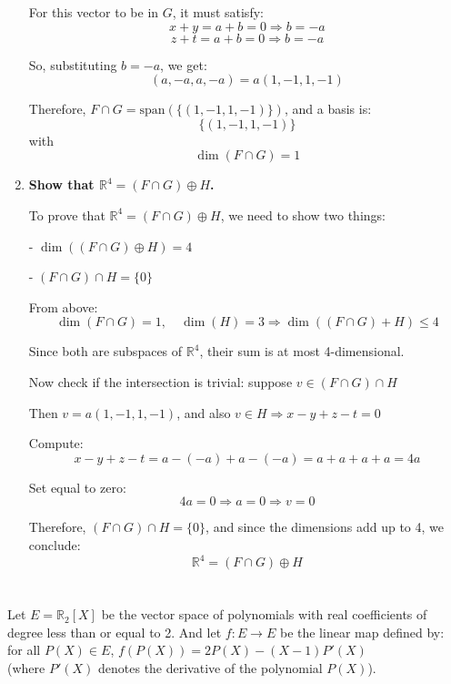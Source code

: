 \documentclass[12pt]{article}
\begin{document}
\begin{answerbox}
\begin{enumerate}
    For this vector to be in $ G $, it must satisfy:
    $$
    x + y = a + b = 0 \Rightarrow b = -a
    $$
    $$
    z + t = a + b = 0 \Rightarrow b = -a
    $$

    So, substituting $ b = -a $, we get:
    $$
    (a, -a, a, -a) = a(1, -1, 1, -1)
    $$

    Therefore, $ F \cap G = \text{span}\left(\{(1, -1, 1, -1)\}\right) $, and a basis is:
    $$
    \{(1, -1, 1, -1)\}
    $$
    with
    $$
    \dim(F \cap G) = 1
    $$

    \item \textbf{Show that $ \mathbb{R}^4 = (F \cap G) \oplus H $.}

    To prove that $ \mathbb{R}^4 = (F \cap G) \oplus H $, we need to show two things:

    
        
- $ \dim((F \cap G) \oplus H) = 4 $
        
- $ (F \cap G) \cap H = \{0\} $
    

    From above:
    $$
    \dim(F \cap G) = 1, \quad \dim(H) = 3 \Rightarrow \dim((F \cap G) + H) \leq 4
    $$

    Since both are subspaces of $ \mathbb{R}^4 $, their sum is at most 4-dimensional.

    Now check if the intersection is trivial: suppose $ v \in (F \cap G) \cap H $

    Then $ v = a(1, -1, 1, -1) $, and also $ v \in H \Rightarrow x - y + z - t = 0 $

    Compute:
    $$
    x - y + z - t = a - (-a) + a - (-a) = a + a + a + a = 4a
    $$

    Set equal to zero:
    $$
    4a = 0 \Rightarrow a = 0 \Rightarrow v = 0
    $$

    Therefore, $ (F \cap G) \cap H = \{0\} $, and since the dimensions add up to 4, we conclude:
    $$
    \mathbb{R}^4 = (F \cap G) \oplus H
    $$

\end{enumerate}
\end{answerbox}

\newpage  
\section{}
Let $E = \mathbb{R}_2[X]$ be the vector space of polynomials with real coefficients of degree less than or equal to 2. And let $f: E \rightarrow E$ be the linear map defined by:\\
for all $P(X) \in E$, $f(P(X)) = 2P(X) - (X - 1)P'(X)$\\
(where $P'(X)$ denotes the derivative of the polynomial $P(X)$).
\end{document}
